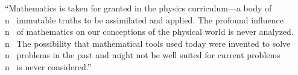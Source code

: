 \documentclass[preview]{standalone}
\begin{document}
\begin{justify}
``Mathematics is taken for granted in the physics curriculum—a body of \\n \
                        immutable truths to be assimilated and applied. The profound influence \\n \
                        of mathematics on our conceptions of the physical world is never analyzed. \\n \
                        The possibility that mathematical tools used today were invented to solve \\n \
                        problems in the past and might not be well suited for current problems \\n \
                        is never considered.''
\end{justify}
\end{document}
